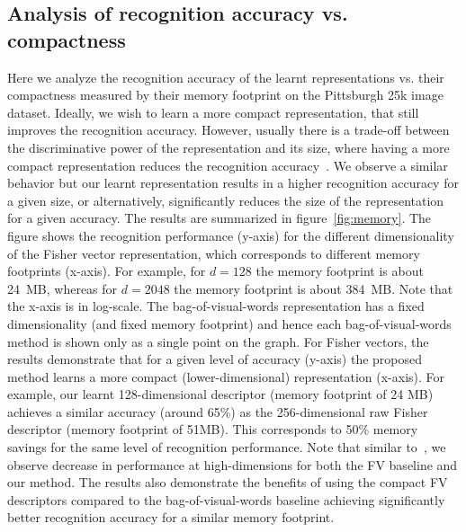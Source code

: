   \subsection{Analysis of recognition accuracy vs. compactness}
  \label{sec:memory_results}
  Here we analyze the recognition accuracy of the learnt representations vs. their compactness measured by their memory footprint on the Pittsburgh 25k image dataset.
  Ideally, we wish to learn a more compact representation, that still improves the recognition accuracy. However, usually there is a trade-off between the discriminative power of the representation and its size, where having a more compact representation reduces the recognition accuracy~\cite{Jegou12}. We observe a similar behavior but our learnt representation results in a higher recognition accuracy for a given size, or alternatively, significantly reduces the size of the representation for a given accuracy.   
   The results are summarized in figure~\ref{fig:memory}.
     The figure shows the recognition performance (y-axis) for the different dimensionality of the Fisher vector representation, which corresponds to different memory footprints (x-axis). For example, for $d=128$ the memory footprint is about 24~MB, whereas for $d=2048$ the memory footprint is about 384~MB. Note that the x-axis is in log-scale. The bag-of-visual-words representation has a fixed dimensionality (and fixed memory footprint) and hence each bag-of-visual-words method is shown only as a single point on the graph.  For Fisher vectors, the results demonstrate that for a given level of accuracy (y-axis) the proposed method learns a more compact (lower-dimensional) representation (x-axis). For example, our learnt 128-dimensional descriptor (memory footprint of 24 MB) achieves a similar accuracy (around 65\%) as the 256-dimensional raw Fisher descriptor (memory footprint of 51MB). This corresponds to 50\% memory savings for the same level of recognition performance. Note that similar to~\cite{Jegou12}, we observe decrease in performance at high-dimensions for both the FV baseline and our method. The results also demonstrate the benefits of using the compact FV descriptors compared to the bag-of-visual-words baseline achieving significantly better recognition accuracy for a similar memory footprint.
    

